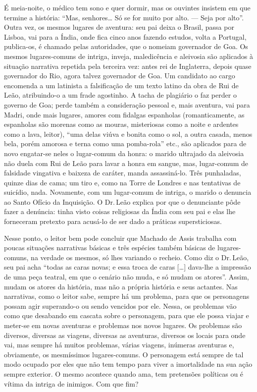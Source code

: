 É meia-noite, o médico tem sono e quer dormir, mas os ouvintes insistem
em que termine a história: ``Mas, senhores\ldots{} Só se for muito por alto.
--- Seja por alto''. Outra vez, os mesmos lugares de aventura: seu pai
deixa o Brasil, passa por Lisboa, vai para a Índia, onde fica cinco anos
fazendo estudos, volta a Portugal, publica-os, é chamado pelas
autoridades, que o nomeiam governador de Goa. Os mesmos lugares-comuns
de intriga, inveja, maledicência e aleivosia são aplicados à situação
narrativa repetida pela terceira vez: antes rei de Inglaterra, depois
quase governador do Rio, agora talvez governador de Goa. Um candidato ao
cargo encomenda a um latinista a falsificação de um texto latino da obra
de Rui de Leão, atribuindo-o a um frade agostinho. A tacha de plagiário
o faz perder o governo de Goa; perde também a consideração pessoal e,
mais aventura, vai para Madri, onde mais lugares, amores com fidalgas
espanholas (romanticamente, as espanholas são morenas como as mouras,
misteriosas como a noite e ardentes como a lava, leitor), ``uma delas
viúva e bonita como o sol, a outra casada, menos bela, porém amorosa e
terna como uma pomba-rola'' etc., são aplicados para de novo engatar-se
neles o lugar-comum da honra: o marido ultrajado da aleivosia não duela
com Rui de Leão para lavar a honra em sangue, mas, lugar-comum de
falsidade vingativa e baixeza de caráter, manda assassiná-lo. Três
punhaladas, quinze dias de cama; um tiro e, como na Torre de Londres e
nas tentativas de suicídio, nada. Novamente, com um lugar-comum de
intriga, o marido o denuncia ao Santo Ofício da Inquisição. O Dr.\,Leão
explica por que o denunciante pôde fazer a denúncia: tinha visto coisas
religiosas da Índia com seu pai e elas lhe forneceram pretexto para
acusá-lo de ser dado a práticas supersticiosas.

Nesse ponto, o leitor bem pode concluir que Machado de Assis trabalha
com poucas situações narrativas básicas e três espécies também básicas
de lugares-comuns, na verdade os mesmos, só lhes variando o recheio.
Como diz o Dr.\,Leão, seu pai acha ``todas as caras novas; e essa troca de
caras {[}\ldots{}{]} dava-lhe a impressão de uma peça teatral, em que o
cenário não muda, e só mudam os atores''. Assim, mudam os atores da
história, mas não a própria história e seus actantes. Nas narrativas,
como o leitor sabe, sempre há um problema, para que os personagens
possam agir superando-o ou sendo vencidos por ele. Nessa, os problemas
vão como que desabando em cascata sobre o personagem, para que ele possa
viajar e meter-se em novas aventuras e problemas nos novos lugares. Os
problemas são diversos, diversas as viagens, diversas as aventuras,
diversos os locais para onde vai, mas sempre há muitos problemas, várias
viagens, inúmeras aventuras e, obviamente, os mesmíssimos
lugares-comuns. O personagem está sempre de tal modo ocupado por eles
que não tem tempo para viver a imortalidade na sua ação sempre exterior.
O mesmo acontece quando ama, tem pretensões políticas ou é vítima da
intriga de inimigos. Com que fim?


